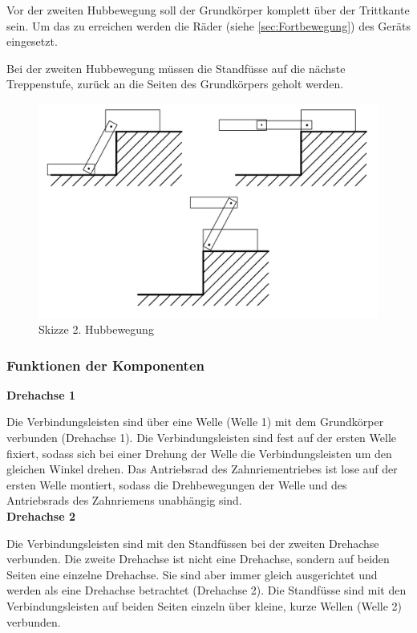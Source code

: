 Vor der zweiten Hubbewegung soll der Grundkörper komplett über der Trittkante sein. Um das zu erreichen werden die Räder (siehe \ref{sec:Fortbewegung}) des Geräts eingesetzt.
 
Bei der zweiten Hubbewegung müssen die Standfüsse auf die nächste Treppenstufe, zurück an die Seiten des Grundkörpers geholt werden.

\begin{figure}[H]
  \includegraphics[width=1\textwidth]{img/Treppensteigen/2. Hubbewegung Skizze.png}
  \centering
  \caption{Skizze 2. Hubbewegung}
\end{figure}

\newpage

\subsubsection{Funktionen der Komponenten}

\textbf{Drehachse 1}

Die Verbindungsleisten sind über eine Welle (Welle 1) mit dem Grundkörper verbunden (Drehachse 1). Die Verbindungsleisten sind fest auf der ersten Welle fixiert, sodass sich bei einer Drehung der Welle die Verbindungsleisten um den gleichen Winkel drehen. Das Antriebsrad des Zahnriementriebes ist lose auf der ersten Welle montiert, sodass die Drehbewegungen der Welle und des Antriebsrads des Zahnriemens unabhängig sind.
\\


\textbf{Drehachse 2}

Die Verbindungsleisten sind mit den Standfüssen bei der zweiten Drehachse verbunden. Die zweite Drehachse ist nicht eine Drehachse, sondern auf beiden Seiten eine einzelne Drehachse. Sie sind aber immer gleich ausgerichtet und werden als eine Drehachse betrachtet (Drehachse 2). Die Standfüsse sind mit den Verbindungsleisten auf beiden Seiten einzeln über kleine, kurze Wellen (Welle 2) verbunden. 

